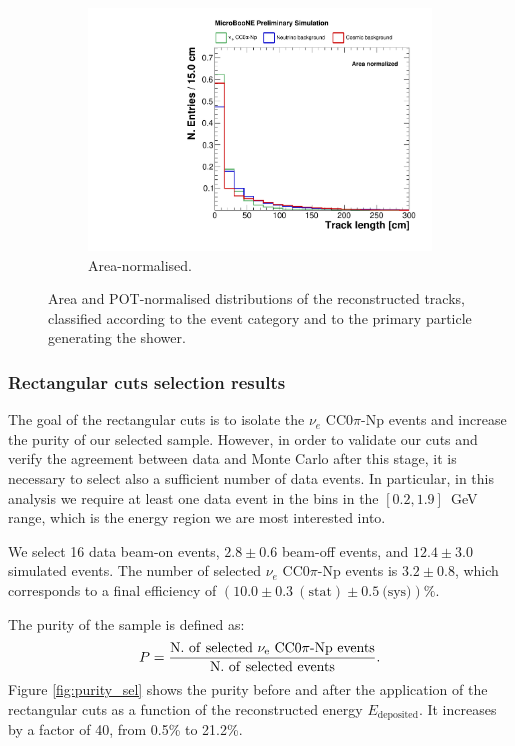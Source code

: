 \begin{figure}[htbp]
\begin{subfigure}{0.49\textwidth}
    \includegraphics[width=\linewidth]{figures/h_track_length_norm.pdf}
    \caption{Area-normalised.} \label{fig:length_norm}
  \end{subfigure}
  \caption{Area and POT-normalised distributions of the reconstructed tracks, classified according to the event category and to the primary particle generating the shower.}
\end{figure}

\subsubsection{Rectangular cuts selection results}
The goal of the rectangular cuts is to isolate the $\nu_e$ CC0$\pi$-Np events and increase the purity of our selected sample. However, in order to validate our cuts and verify the agreement between data and Monte Carlo after this stage, it is necessary to select also a sufficient number of data events. In particular, in this analysis we require at least one data event in the bins in the $[0.2,1.9]$~GeV range, which is the energy region we are most interested into. 

We select 16 data beam-on events, $2.8\pm0.6$ beam-off events, and $12.4\pm3.0$ simulated events. The number of selected $\nu_e$ CC0$\pi$-Np events is $3.2\pm0.8$, which corresponds to a final efficiency of $(10.0\pm0.3~\mathrm{(stat)}\pm0.5~\text{(sys)})\%$. 

The purity of the sample is defined as:
\begin{equation}
P = \frac{\mathrm{N.~of~selected~\nu_e~CC0}\pi\mathrm{{\text -}Np~events}}{\mathrm{N.~of~selected~events}}.
\end{equation}
Figure \ref{fig:purity_sel} shows the purity before and after the application of the rectangular cuts as a function of the reconstructed energy $E_{\mathrm{deposited}}$. It increases by a factor of 40, from 0.5\% to 21.2\%.

